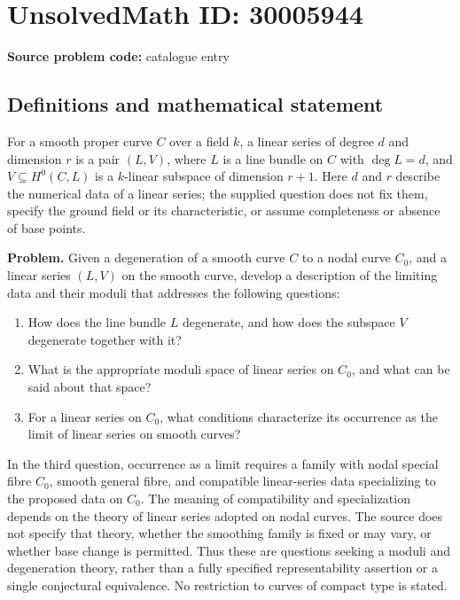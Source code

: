 \documentclass[11pt]{article}
\begin{document}
\section*{UnsolvedMath ID: 30005944}
\textbf{Source problem code:} catalogue entry
\subsection{Definitions and mathematical statement}
For a smooth proper curve \(C\) over a field \(k\), a linear series of degree \(d\) and dimension \(r\) is a pair \((L,V)\), where \(L\) is a line bundle on \(C\) with \(\deg L=d\), and \(V\subseteq H^0(C,L)\) is a \(k\)-linear subspace of dimension \(r+1\). Here \(d\) and \(r\) describe the numerical data of a linear series; the supplied question does not fix them, specify the ground field or its characteristic, or assume completeness or absence of base points.

\textbf{Problem.} Given a degeneration of a smooth curve \(C\) to a nodal curve \(C_0\), and a linear series \((L,V)\) on the smooth curve, develop a description of the limiting data and their moduli that addresses the following questions:
\begin{enumerate}
\item How does the line bundle \(L\) degenerate, and how does the subspace \(V\) degenerate together with it?
\item What is the appropriate moduli space of linear series on \(C_0\), and what can be said about that space?
\item For a linear series on \(C_0\), what conditions characterize its occurrence as the limit of linear series on smooth curves?
\end{enumerate}
In the third question, occurrence as a limit requires a family with nodal special fibre \(C_0\), smooth general fibre, and compatible linear-series data specializing to the proposed data on \(C_0\). The meaning of compatibility and specialization depends on the theory of linear series adopted on nodal curves. The source does not specify that theory, whether the smoothing family is fixed or may vary, or whether base change is permitted. Thus these are questions seeking a moduli and degeneration theory, rather than a fully specified representability assertion or a single conjectural equivalence. No restriction to curves of compact type is stated.
\end{document}
